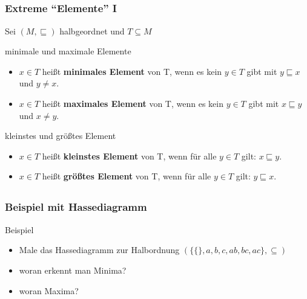 \subsection*{}
\begin{frame}
  \frametitle{Extreme "`Elemente"' I}
  Sei $( M, \sqsubseteq )$ halbgeordnet und $T \subseteq M$ \pause
  \begin{block}{minimale und maximale Elemente}
    \begin{itemize}
    \item $x \in T$ heißt \textbf{minimales Element} von T, wenn es kein $y \in T$ gibt mit $y \sqsubseteq x$ und $y \neq x$. \pause
    \item $x \in T$ heißt \textbf{maximales Element} von T, wenn es kein $y \in T$ gibt mit $x \sqsubseteq y$ und $x \neq y$. \pause
    \end{itemize}
	\end{block}
	\begin{block}{kleinstes und größtes Element}
    \begin{itemize}
    \item $x \in T$ heißt \textbf{kleinstes Element} von T, wenn für alle $y \in T$ gilt: $x \sqsubseteq y$. \pause
    \item $x \in T$ heißt \textbf{größtes Element} von T, wenn für alle $y \in T$ gilt: $y \sqsubseteq x$.
    \end{itemize}
  \end{block}
\end{frame}

\subsection*{}
\begin{frame}
  \frametitle{Beispiel mit Hassediagramm}
  \begin{block}{Beispiel}
    \begin{itemize}
    \item Male das Hassediagramm zur Halbordnung $(\{ \{\}, a, b, c, ab, bc, ac\}, \subseteq)$ \pause
    \item woran erkennt man Minima? \pause
    \item woran Maxima?
    \end{itemize}
	\end{block}
\end{frame}

